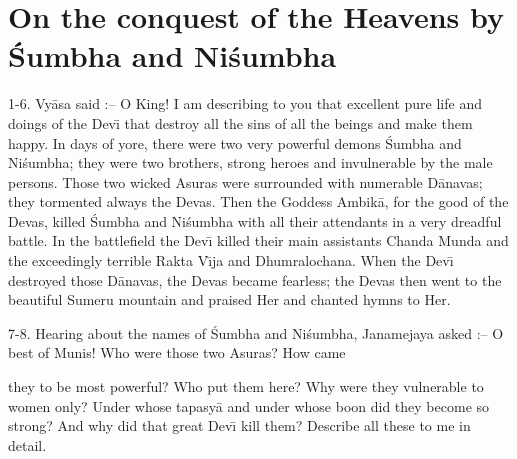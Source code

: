 \chapter{On the conquest of the Heavens by \'Sumbha and Ni\'sumbha}

1-6. Vy\=asa said :-- O King! I am describing to you that excellent pure life and doings of the Dev\={\i} that destroy all the sins of all the beings and make them happy. In days of yore, there were two very powerful demons \'Sumbha and Ni\'sumbha; they were two brothers, strong heroes and invulnerable by the male persons. Those two wicked Asuras were surrounded with numerable D\=anavas; they tormented always the Devas. Then the Goddess Ambik\=a, for the good of the Devas, killed \'Sumbha and Ni\'sumbha with all their attendants in a very dreadful battle. In the battlefield the Dev\={\i} killed their main assistants Chanda Munda and the exceedingly terrible Rakta V\={\i}ja and Dhumralochana. When the Dev\={\i} destroyed those D\=anavas, the Devas became fearless; the Devas then went to the beautiful Sumeru mountain and praised Her and chanted hymns to Her.

7-8. Hearing about the names of \'Sumbha and Ni\'sumbha, Janamejaya asked :-- O best of Munis! Who were those two Asuras? How came

they to be most powerful? Who put them here? Why were they vulnerable to women only? Under whose tapasy\=a and under whose boon did they become so strong? And why did that great Dev\={\i} kill them? Describe all these to me in detail.


